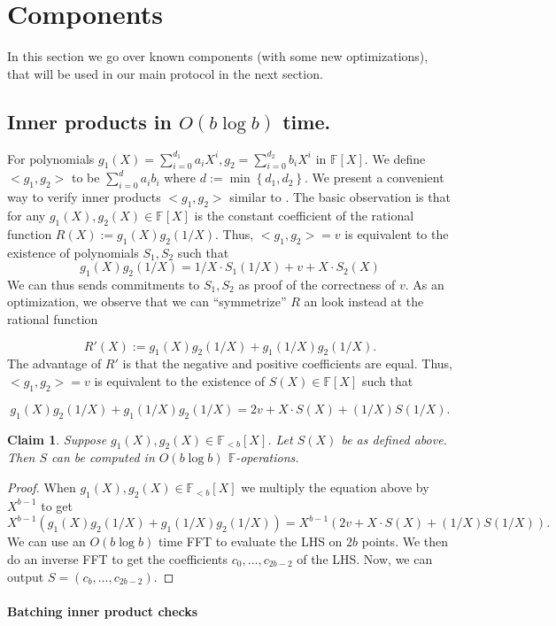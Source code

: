 \documentclass[11pt]{article} %
\newcommand{\F}{\ensuremath{\mathbb F}\xspace}
\newcommand{\defeq}{:=}
\newcommand{\set}[1]{\ensuremath{\left\{#1\right\}}\xspace}
\newcommand{\polysofdeg}[1]{\ensuremath{\F_{< #1}[X]}\xspace}
\newcommand{\polys}{\ensuremath{\F[X]}\xspace}
\newtheorem{claim}[lemma]{Claim}
\begin{document}
\section{Components}
In this section we go over known components (with some new optimizations), that will be used in our main protocol in the next section. 
\subsection{Inner products in $O(b\log b)$ time.}
For polynomials $g_1(X)=\sum_{i=0}^{d_1} a_i X^i,g_2=\sum_{i=0}^{d_2} b_i X^i$ in $\polys$.
We define $<g_1,g_2>$ to be $\sum_{i=0}^d a_i b_i$ where $d\defeq \min \set{d_1,d_2}$. 
We present a convenient way to verify inner products $<g_1,g_2>$ similar to \cite{bootle,sonic}.
The basic observation is that for any $g_1(X),g_2(X)\in \polys$ is the constant coefficient of the rational function
$R(X)\defeq g_1(X) g_2(1/X)$.
Thus, $<g_1,g_2>=v$ is equivalent to the existence of polynomials $S_1,S_2$ such that
\[g_1(X) g_2(1/X)=1/X\cdot S_1(1/X) + v + X\cdot S_2(X)\] 
We can thus sends commitments to $S_1,S_2$ as proof of the correctness of $v$.
As an optimization, we observe that we can ``symmetrize'' $R$ an look instead at the rational function

\[R'(X)\defeq g_1(X) g_2(1/X)+g_1(1/X) g_2(1/X).\]
The advantage of $R'$ is that the negative and positive coefficients are equal. Thus,
$<g_1,g_2>=v$ is equivalent to the existence of $S(X)\in \polys$ such that

\[ g_1(X) g_2(1/X)+g_1(1/X) g_2(1/X)=2v + X\cdot S(X) + (1/X)S(1/X).\]

\begin{claim}\label{clm:}
 Suppose $g_1(X),g_2(X)\in \polysofdeg{b}$. Let $S(X)$ be as defined above.
 Then $S$ can be computed in $O(b \log b)$ \F-operations.
\end{claim}
\begin{proof}
When $g_1(X),g_2(X)\in \polysofdeg{b}$ we multiply the equation above by $X^{b-1}$ to get
\[ X^{b-1}(g_1(X) g_2(1/X)+g_1(1/X) g_2(1/X))=X^{b-1}(2v + X\cdot S(X) + (1/X)S(1/X)).\]
We can use an $O(b \log b )$ time FFT to evaluate the LHS on $2b$ points. We then do an inverse
FFT to get the coefficients $c_0,\ldots,c_{2b-2}$ of the LHS. Now, we can output $S=(c_b,\ldots, c_{2b-2})$.
\end{proof}

\paragraph{Batching inner product checks}
\end{document}
